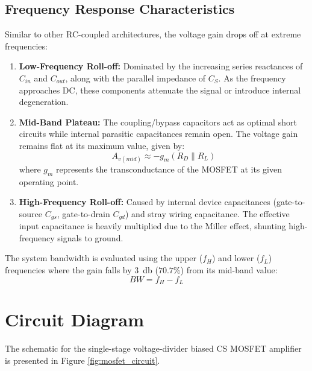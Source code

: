 \subsection{Frequency Response Characteristics}
Similar to other RC-coupled architectures, the voltage gain drops off at extreme frequencies:
\begin{enumerate}
	\item \textbf{Low-Frequency Roll-off:} Dominated by the increasing series reactances of $C_{in}$ and $C_{out}$, along with the parallel impedance of $C_S$. As the frequency approaches DC, these components attenuate the signal or introduce internal degeneration.
	\item \textbf{Mid-Band Plateau:} The coupling/bypass capacitors act as optimal short circuits while internal parasitic capacitances remain open. The voltage gain remains flat at its maximum value, given by:
	\begin{equation}
		A_{v(mid)} \approx -g_m (R_D \parallel R_L)
	\end{equation}
	where $g_m$ represents the transconductance of the MOSFET at its given operating point.
	\item \textbf{High-Frequency Roll-off:} Caused by internal device capacitances (gate-to-source $C_{gs}$, gate-to-drain $C_{gd}$) and stray wiring capacitance. The effective input capacitance is heavily multiplied due to the Miller effect, shunting high-frequency signals to ground.
\end{enumerate}

The system bandwidth is evaluated using the upper ($f_H$) and lower ($f_L$) frequencies where the gain falls by \SI{3}{\decibel} ($70.7\%$) from its mid-band value:
\begin{equation}
	BW = f_H - f_L
\end{equation}

\section{Circuit Diagram}
The schematic for the single-stage voltage-divider biased CS MOSFET amplifier is presented in Figure \ref{fig:mosfet_circuit}.

